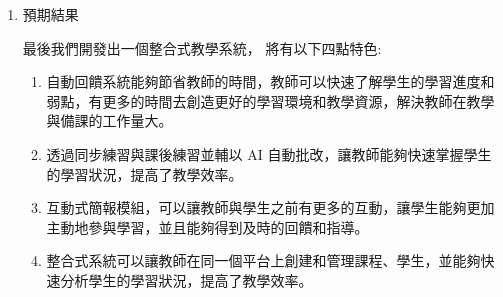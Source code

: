 \documentclass[12pt]{article}
\begin{document}
\begin{enumerate}
\begin{enumerate}
    \end{enumerate}

  \item 預期結果
    \par 最後我們開發出一個整合式教學系統，
    將有以下四點特色:
    \begin{enumerate}
      \item 自動回饋系統能夠節省教師的時間，教師可以快速了解學生的學習進度和弱點，有更多的時間去創造更好的學習環境和教學資源，解決教師在教學與備課的工作量大。
      \item 透過同步練習與課後練習並輔以 AI 自動批改，讓教師能夠快速掌握學生的學習狀況，提高了教學效率。
      \item 互動式簡報模組，可以讓教師與學生之前有更多的互動，讓學生能夠更加主動地參與學習，並且能夠得到及時的回饋和指導。
      \item 整合式系統可以讓教師在同一個平台上創建和管理課程、學生，並能夠快速分析學生的學習狀況，提高了教學效率。
    \end{enumerate}


\end{enumerate}
\end{document}
